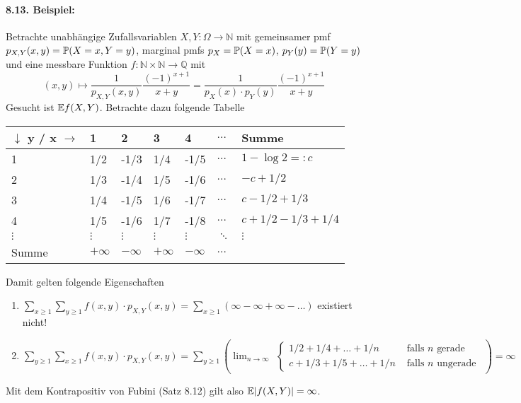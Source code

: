 \paragraph{8.13. Beispiel:}Betrachte unabh\"angige Zufallsvariablen $X,Y:\Omega\to\mathbb{N}$ mit gemeinsamer pmf $p_{X,Y}(x,y)=\mathbb{P}(X=x,Y=y)$, marginal pmfs $p_X=\mathbb{P}(X=x)$, $p_Y(y)=\mathbb{P}(Y=y)$ und eine messbare Funktion $f:\mathbb{N}\times\mathbb{N}\to\mathbb{Q}$ mit 
$$(x,y)\mapsto\dfrac{1}{p_{X,Y}(x,y)}\dfrac{(-1)^{x+1}}{x+y}=\dfrac{1}{p_X(x)\cdot p_Y(y)}\dfrac{(-1)^{x+1}}{x+y}$$
Gesucht ist $\mathbb{E} f(X,Y)$. Betrachte dazu folgende Tabelle\newline
\begin{center}
\begin{tabular}{l|lllll|l}
$\downarrow$ y / x $\rightarrow$ & 1 & 2 & 3 & 4 & $\hdots$ & Summe \\
\hline
1   & 1/2  & -1/3  & 1/4  & -1/5  &  $\hdots$  &  $1-\log 2=:c$   \\
2   &  1/3 & -1/4  & 1/5  & -1/6  &  $\hdots$   &  $-c+1/2$   \\
3   &  1/4 & -1/5  & 1/6  & -1/7  &  $\hdots$   & $c-1/2+1/3$    \\
4   &  1/5 &  -1/6 & 1/7  &  -1/8 &  $\hdots$   &  $c+1/2-1/3+1/4$   \\
$\vdots$ &  $\vdots$  & $\vdots$   &  $\vdots$  & $\vdots$   &  $\ddots$   &  $\vdots$    \\
\hline
Summe &  $+\infty$ & $-\infty$  & $+\infty$  & $-\infty$  &  $\hdots$   &    
\end{tabular}
\end{center}
Damit gelten folgende Eigenschaften
\begin{enumerate}[label=(\roman*)]
    \item $\displaystyle\sum_{x\geq1}\sum_{y\geq1}f(x,y)\cdot p_{X,Y}(x,y)=\sum_{x\geq1}(\infty-\infty+\infty-\hdots)$ existiert nicht!
    \item $\displaystyle\sum_{y\geq1}\sum_{x\geq1}f(x,y)\cdot p_{X,Y}(x,y)=\sum_{y\geq1}\left(\lim_{n\to\infty}\begin{aligned}\begin{cases}
        1/2+1/4+\hdots+1/n&\text{ falls }n\text{ gerade}\\
        c+1/3+1/5+\hdots+1/n&\text{ falls }n\text{ ungerade}
    \end{cases}\end{aligned}\right)=\infty$
\end{enumerate}
Mit dem Kontrapositiv von Fubini (Satz 8.12) gilt also $\mathbb{E}|f(X,Y)|=\infty$.

